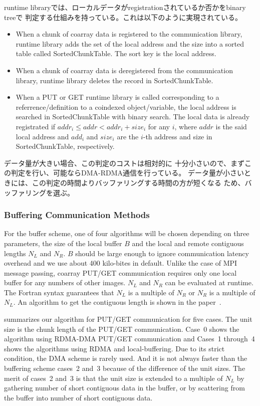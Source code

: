 runtime libraryでは、ローカルデータがregistrationされているか否かをbinary treeで
判定する仕組みを持っている。これは以下のように実現されている。
\begin{itemize}
\item
When a chunk of coarray data is registered to the communication library, 
runtime library adds the set of the local address and the size into a sorted 
table called SortedChunkTable. The sort key is the local address.
\item
When a chunk of coarray data is deregistered from the communication library, 
runtime library deletes the record in SortedChunkTable.
\item
When a PUT or GET runtime library is called corresponding to a referrence/definition
to a coindexed object/variable, the local address is searched in SortedChunkTable
with binary search. The local data is already registrated if 
$addr_i \leq addr < addr_i + size_i$ for any $i$,
where $addr$ is the said local address and $add_i$ and $size_i$ are the
$i$-th address and size in SortedChunkTable, respectively.
\end{itemize}

データ量が大きい場合、この判定のコストは相対的に
十分小さいので、まずこの判定を行い、可能ならDMA-RDMA通信を行っている。
データ量が小さいときには、この判定の時間よりバッファリングする時間の方が短くなる
ため、バッファリングを選ぶ。


\subsubsection{Buffering Communication Methods}

For the buffer scheme, one of four algorithms will be chosen 
depending on three parameters, the size of the local buffer $B$ and the 
local and remote contiguous lengths $N_L$ and $N_R$.
$B$ should be large enough to ignore communication latency overhead and we use
about 400 kilo-bites in default. Unlike the case of MPI message passing,
coarray PUT/GET communication requires only one local buffer for any numbers of
other images.
$N_L$ and $N_R$ can be evaluated at runtime. The Fortran syntax guarantees 
that $N_L$ is a multiple of $N_R$ or $N_R$ is a multiple of $N_L$.
An algorithm to get the contiguous length is shown in the paper~\cite{pgas15}.

 summarizes our algorithm for PUT/GET communication for five cases.
The unit size is the chunk length of the PUT/GET communication.
Case~0 shows the algorithm using RDMA-DMA PUT/GET communication and Cases~1 through~4
shows the algorithms using RDMA and local-buffering. 
Due to its strict condition, the DMA scheme is rarely used.
And it is not always faster than the buffering scheme cases~2 and~3 because of the 
difference of the unit sizes. The merit of cases~2 and~3 is that the unit size 
is extended to a multiple of $N_L$ by gathering number of short contiguous data in the buffer,
or by scattering from the buffer into number of short contiguous data.

